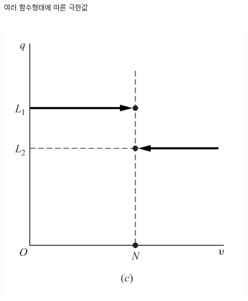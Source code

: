 \documentclass[aspectratio=169]{beamer}
\begin{document}
\begin{frame}{여러 함수형태에 따른 극한값}

  \begin{columns}
    \begin{column}{0.5\textwidth}
      \centering
      \includegraphics[width=\linewidth,height=0.48\textheight,keepaspectratio]{../fig/limits_illustration_c.png}
    \end{column}
    \begin{column}{0.5\textwidth}
      \centering

\end{column}
\end{columns}
\end{frame}
\end{document}
